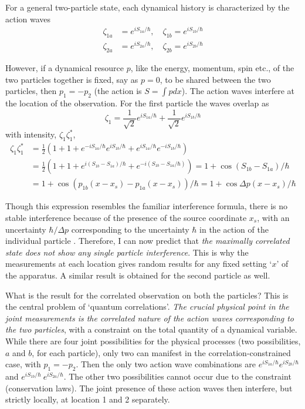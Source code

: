For a general two-particle state, each dynamical history is characterized by the action waves
\begin{align*}
\zeta_{1a} & = e^{iS_{1a}/\hbar}, \quad \zeta_{1b}  = e^{iS_{1b}/\hbar} \nonumber\\
\zeta_{2a} & = e^{iS_{2a} /\hbar}, \quad \zeta_{2b} = e^{iS_{2b}/\hbar} \tag{33}\label{c14-eq33}
\end{align*}

However, if a dynamical resource $p$, like the energy, momentum, spin etc., of the two particles
together is fixed, say as $p = 0$, to be shared between the two particles, then $p_1 = - p_2$ (the
action is $S = \int pdx$). The action waves interfere at the location of the observation. 
For the first particle the waves overlap as
\begin{equation*}
\zeta_1 = \frac{1}{\sqrt{2}} e^{iS_{1a}/ \hbar}  + \frac{1}{\sqrt{2}} e^{iS_{1b} /\hbar} \tag{34}\label{c14-eq34}
\end{equation*}
with intensity, $\zeta_1 \zeta_1^{\ast}$,
{\fontsize{9}{9}\selectfont\begin{align*}
\zeta_1 \zeta^{\ast}_1 & = \frac{1}{2} \left(1+1+e^{-iS_{1a}/ \hbar} e^{iS_{1b} / \hbar} + e^{iS_{1a} / \hbar} e^{-iS_{1b}/\hbar} \right)\\
& = \frac{1}{2} \left( 1+1+e^{i(S_{1b} - S_{1a})/\hbar} + e^{-i(S_{1b} - S_{1a}/\hbar)} \right) = 1 + \cos (S_{1b} - S_{1a})/\hbar \tag{35}\label{c14-eq35}\\
& = 1 + \cos (p_{1b} (x-x_s) - p_{1a} (x-x_s)) / \hbar = 1 + \cos \Delta p (x-x_s) /\hbar \tag{36}\label{c14-eq36}
\end{align*}}
\newpage

Though this expression resembles the familiar interference formula, there is no stable interference because of the presence of the source coordinate $x_s$, with an uncertainty $\hbar/ \Delta p$ corresponding to the uncertainty $\hbar$ in the action of the individual particle \cite{chap14-key2}. Therefore, I can
now predict that \textit{the maximally correlated state does not show any single particle interference}. This is why the measurements at each location gives random results for any fixed setting `$x$' of the apparatus. A similar result is obtained for the second particle as well.

What is the result for the correlated observation on both the particles? This is the
central problem of `quantum correlations'. \textit{The crucial physical point in the joint measurements is the correlated nature of the action waves corresponding to the two particles}, with a constraint on the total quantity of a dynamical variable. While there are four joint possibilities for the physical processes (two possibilities, $a$ and $b$, for each particle), only two can manifest in the correlation-constrained case, with $p_1 = -p_2$. Then the only two action wave combinations
are $e^{iS_{1a} /\hbar}  e^{iS_{2b} /\hbar}$ and $e^{iS_{1b}/ \hbar} ~e^{iS_{2a}/\hbar}$. The other two possibilities cannot occur due to the
constraint (conservation laws). The joint presence of these action waves then interfere, but strictly locally, at location 1 and 2 separately.

